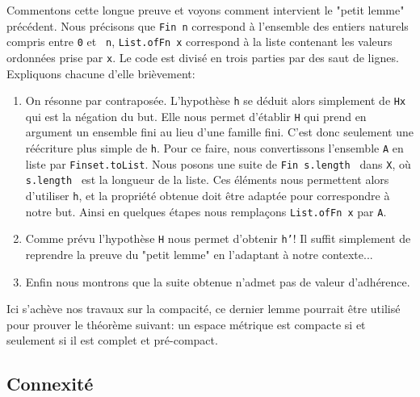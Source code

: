 \documentclass[a4paper, 12pt]{article}
\newcommand{\lean}[1]{\texttt{#1}}
\begin{document}
Commentons cette longue preuve et voyons comment intervient le "petit lemme" précédent. Nous précisons que \lean{Fin n} correspond à l'ensemble des entiers naturels compris entre \lean{0} et \lean{ n},  \lean{List.ofFn x} correspond à la liste contenant les valeurs ordonnées prise par \lean{x}. Le code est divisé en trois parties par des saut de lignes. Expliquons chacune d'elle brièvement:

\begin{enumerate} 
    \item On résonne par contraposée. L'hypothèse \lean{h} se déduit alors simplement de \lean{Hx} qui est la négation du but. Elle nous permet d'établir \lean{H} qui prend en argument
    un ensemble fini au lieu d'une famille fini. C'est donc seulement une réécriture plus simple de \lean{h}. Pour ce faire, nous convertissons l'ensemble \lean{A} en liste par
    \lean{Finset.toList}. Nous posons une suite de \lean{Fin s.length } dans \lean{X}, où \lean{s.length } est la longueur de la liste. Ces éléments nous permettent alors d'utiliser
    \lean{h}, et la propriété obtenue doit être adaptée pour correspondre à notre but. Ainsi en quelques étapes nous remplaçons \lean{List.ofFn x} par \lean{A}.
    
    \item Comme prévu l'hypothèse \lean{H} nous permet d'obtenir \lean{h'}! Il suffit simplement de reprendre la preuve du "petit lemme" en l'adaptant à notre contexte...

    \item Enfin nous montrons que la suite obtenue n'admet pas de valeur d'adhérence.
    
\end{enumerate}

Ici s'achève nos travaux sur la compacité, ce dernier lemme pourrait être utilisé pour prouver le théorème suivant: un espace métrique est compacte si et seulement si il est complet et pré-compact.



\subsection{Connexité}

\newpage

\nocite{*}


\end{document}
